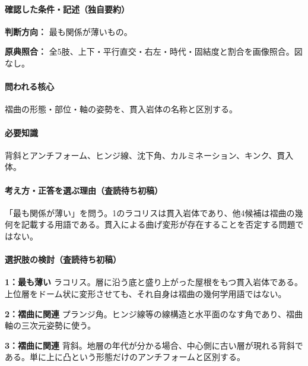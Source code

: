\paragraph{確認した条件・記述（独自要約）}\mbox{}\par

\noindent\textbf{判断方向：} 最も関係が薄いもの。\par

\noindent\textbf{原典照合：} 全5肢、上下・平行直交・右左・時代・固結度と割合を画像照合。図なし。\par

\paragraph{問われる核心} 褶曲の形態・部位・軸の姿勢を、貫入岩体の名称と区別する。

\paragraph{必要知識} 背斜とアンチフォーム、ヒンジ線、沈下角、カルミネーション、キンク、貫入体。

\paragraph{考え方・正答を選ぶ理由（査読待ち初稿）} 「最も関係が薄い」を問う。1のラコリスは貫入岩体であり、他4候補は褶曲の幾何を記載する用語である。貫入による曲げ変形が存在することを否定する問題ではない。

\paragraph{選択肢の検討（査読待ち初稿）}\mbox{}\par

\noindent\textbf{1：最も薄い} ラコリス。層に沿う底と盛り上がった屋根をもつ貫入岩体である。上位層をドーム状に変形させても、それ自身は褶曲の幾何学用語ではない。\par

\noindent\textbf{2：褶曲に関連} プランジ角。ヒンジ線等の線構造と水平面のなす角であり、褶曲軸の三次元姿勢に使う。\par

\noindent\textbf{3：褶曲に関連} 背斜。地層の年代が分かる場合、中心側に古い層が現れる背斜である。単に上に凸という形態だけのアンチフォームと区別する。\par

